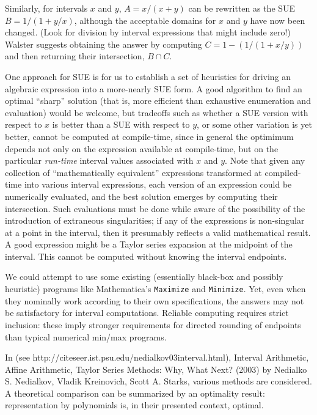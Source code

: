 \documentclass{article}
\begin{document}
Similarly, for intervals $x$ and $y$, $A= x/(x+y)$ can be rewritten as
the SUE $B=1/ (1+y/x)$, although the acceptable domains for $x$ and
$y$ have now been changed. (Look for division by interval expressions
that might include zero!)  Walster suggests obtaining the answer by
computing $C = 1- (1/(1+x/y))$ and then returning their intersection,
$B \cap C$.

One approach for SUE is for us to establish a set of heuristics for
driving an algebraic expression into a more-nearly SUE form.  A good
algorithm to find an optimal ``sharp'' solution (that is, more
efficient than exhaustive enumeration and evaluation) would be
welcome, but tradeoffs such as whether a SUE version with respect to
$x$ is better than a SUE with respect to $y$, or some other variation
is yet better, cannot be computed at compile-time, since in general
the optimimum depends not only on the expression available at
compile-time, but on the particular {\em run-time} interval values associated
with $x$ and $y$.  {Note that given any collection of ``mathematically
equivalent'' expressions transformed at compiled-time into various
interval expressions, each version of an expression could be
numerically evaluated, and the best solution emerges by computing
their intersection.}  Such evaluations must be done while aware of the
possibility of the introduction of extraneous singularities; if any of
the expressions is non-singular at a point in the interval, then it
presumably reflects a valid mathematical result. A good expression might be
a Taylor series expansion at the midpoint of the interval. This cannot be
computed without knowing the interval endpoints.

We could attempt to use some existing (essentially black-box and
possibly heuristic) programs like Mathematica's {\tt Maximize} and
{\tt Minimize}.  Yet, even when they nominally work according to their
own specifications, the answers may not be satisfactory for interval
computations. Reliable computing requires strict inclusion: these
imply stronger requirements for directed rounding of endpoints than
typical numerical min/max programs.

In (see http://citeseer.ist.psu.edu/nedialkov03interval.html),
Interval Arithmetic, Affine Arithmetic, Taylor Series Methods: Why,
What Next? (2003) by Nedialko S. Nedialkov, Vladik Kreinovich, Scott
A. Starks, various methods are considered. 
A theoretical comparison can be summarized by an
optimality result: representation by polynomials is, in their presented
context, optimal.
\end{document}
